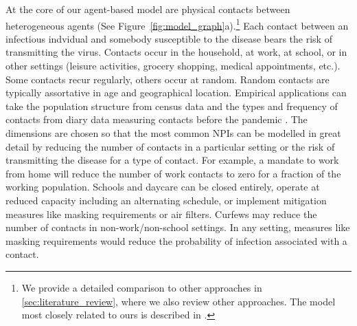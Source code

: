At the core of our agent-based model are physical contacts between heterogeneous agents (See Figure~\ref{fig:model_graph}a).\footnote{We provide a detailed comparison to other approaches in \ref{sec:literature_review}, where we also review other approaches. The model most closely related to ours is described in \citet{Hinch2020}.} Each contact between an infectious indvidual and somebody susceptible to the disease bears the risk of transmitting the virus. Contacts occur in the household, at work, at school, or in other settings (leisure activities, grocery shopping, medical appointments, etc.). Some contacts recur regularly, others occur at random. Random contacts are typically assortative in age and geographical location. Empirical applications can take the population structure from census data and the types and frequency of contacts from diary data measuring contacts before the pandemic \citep[e.g.][]{Mossong2008}. The dimensions are chosen so that the most common NPIs can be modelled in great detail by reducing the number of contacts in a particular setting or the risk of transmitting the disease for a type of contact. For example, a mandate to work from home will reduce the number of work contacts to zero for a fraction of the working population. Schools and daycare can be closed entirely, operate at reduced capacity including an alternating schedule, or implement mitigation measures like masking requirements or air filters. Curfews may reduce the number of contacts in non-work/non-school settings. In any setting, measures like masking requirements would reduce the probability of infection associated with a contact.


